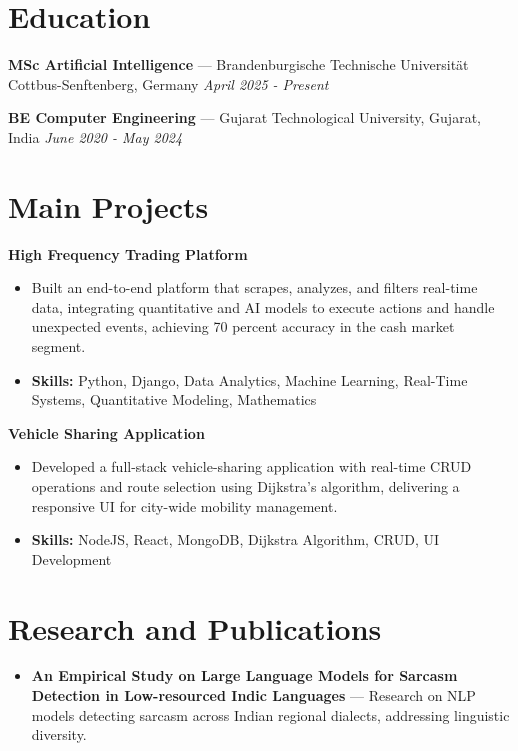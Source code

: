 \documentclass[a4paper,10pt]{article}
\begin{document}
\section*{Education}
\textbf{MSc Artificial Intelligence} — Brandenburgische Technische Universität Cottbus-Senftenberg, Germany \hfill \textit{April 2025 - Present}\par
\vspace{1.5pt}
\textbf{BE Computer Engineering} — Gujarat Technological University, Gujarat, India \hfill \textit{June 2020 - May 2024}\par

\section*{Main Projects}
\textbf{High Frequency Trading Platform}\par
\vspace{1pt}
\begin{itemize}
  \item Built an end-to-end platform that scrapes, analyzes, and filters real-time data, integrating quantitative and AI models to execute actions and handle unexpected events, achieving 70 percent accuracy in the cash market segment.
  \item \textbf{Skills:} Python, Django, Data Analytics, Machine Learning, Real-Time Systems, Quantitative Modeling, Mathematics
\end{itemize}
\vspace{3pt}
\textbf{Vehicle Sharing Application}\par
\vspace{1pt}
\begin{itemize}
  \item Developed a full-stack vehicle-sharing application with real-time CRUD operations and route selection using Dijkstra's algorithm, delivering a responsive UI for city-wide mobility management.
  \item \textbf{Skills:} NodeJS, React, MongoDB, Dijkstra Algorithm, CRUD, UI Development
\end{itemize}

\section*{Research and Publications}
\begin{itemize}
\item \textbf{An Empirical Study on Large Language Models for Sarcasm Detection in Low-resourced Indic Languages} — Research on NLP models detecting sarcasm across Indian regional dialects, addressing linguistic diversity.
\end{itemize}
\end{document}
